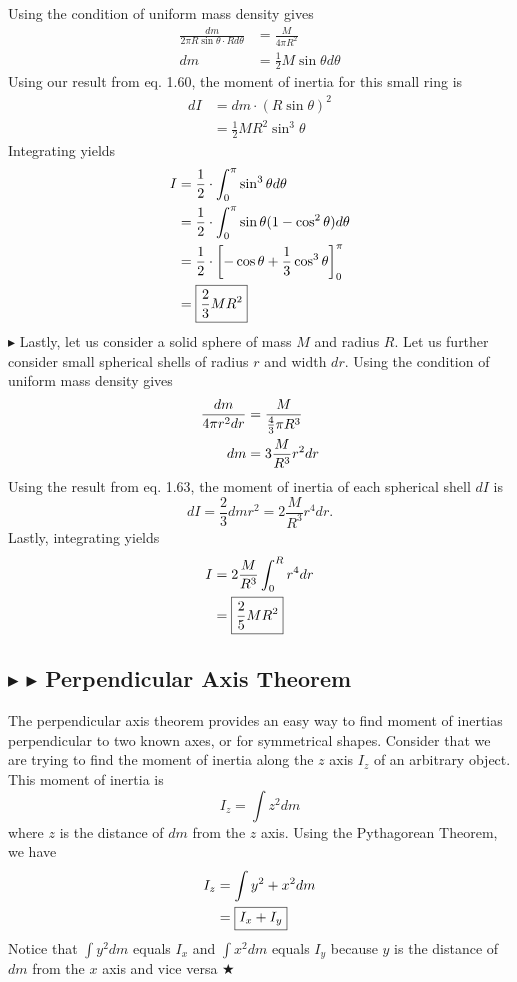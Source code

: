 \noindent Using the condition of uniform mass density gives
\begin{align*}
    \frac{dm}{2\pi R\sin\theta \cdot Rd\theta} &= \frac{M}{4\pi R^2} \\
    dm &= \frac12 M \sin\theta d\theta
\end{align*}
\noindent Using our result from eq. 1.60, the moment of inertia for this small ring is 
\begin{align*}
    dI &= dm \cdot (R\sin\theta)^2 \\
    &= \frac12 MR^2 \sin^3\theta
\end{align*}
\noindent Integrating yields
\begin{align}
    I &= \frac12 \cdot \int_0^\pi \sin^3 \theta d\theta \nonumber \\
    &= \frac12 \cdot \int_0^\pi \sin\theta(1-\cos^2\theta) d\theta \nonumber \\
    &= \frac12 \cdot \left[-\cos\theta +\frac13 \cos^3\theta\right]_0^\pi \nonumber \\
    &= \boxed{\frac23 MR^2}
\end{align}
\noindent $\blacktriangleright$ Lastly, let us consider a solid sphere of mass $M$ and radius $R$. Let us further consider small spherical shells of radius $r$ and width $dr$. Using the condition of uniform mass density gives
\begin{align*}
    \frac{dm}{4\pi r^2 dr} &= \frac{M}{\frac43 \pi R^3} \nonumber \\
    dm &= 3\frac{M}{R^3} r^2 dr
\end{align*}
\noindent Using the result from eq. 1.63, the moment of inertia of each spherical shell $dI$ is
\begin{equation*}
    dI = \frac23 dm r^2 = 2\frac{M}{R^3} r^4 dr.
\end{equation*}
\noindent Lastly, integrating yields
\begin{align}
    I &= 2\frac{M}{R^3} \int_0^R r^4 dr \nonumber \\
    &= \boxed{\frac25 MR^2}
\end{align}
\subsection{\color{Goldenrod} $\blacktriangleright$ \color{Orchid} $\blacktriangleright$ \color{black} Perpendicular Axis Theorem}
The perpendicular axis theorem provides an easy way to find moment of inertias perpendicular to two known axes, or for symmetrical shapes. Consider that we are trying to find the moment of inertia along the $z$ axis $I_z$ of an arbitrary object. This moment of inertia is
\begin{equation*}
    I_z = \int z^2 dm
\end{equation*}
\noindent where $z$ is the distance of $dm$ from the $z$ axis. Using the Pythagorean Theorem, we have
\begin{align}
    I_z &= \int y^2 + x^2 dm \nonumber \\
    &= \boxed{I_x + I_y}
\end{align}
\noindent Notice that $\int y^2 dm$ equals $I_x$ and $\int x^2 dm$ equals $I_y$ because $y$ is the distance of $dm$ from the $x$ axis and vice versa $\bigstar$

